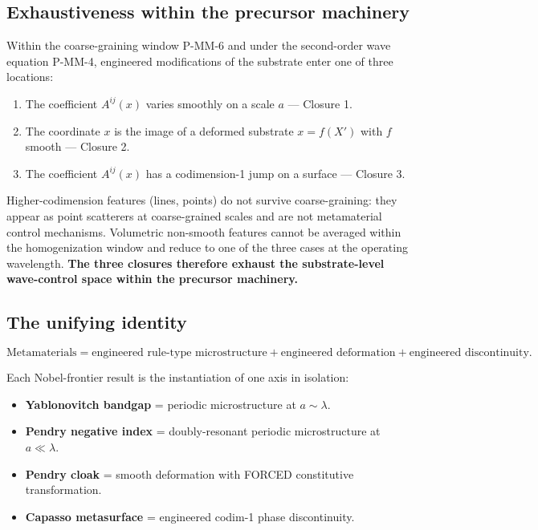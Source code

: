 \documentclass[11pt,a4paper]{article}
\begin{document}
\subsection{Exhaustiveness within the precursor machinery}

Within the coarse-graining window P-MM-6 and under the second-order wave equation P-MM-4, engineered modifications of the substrate enter one of three locations:

\begin{enumerate}[noitemsep]
\item The coefficient $A^{ij}(x)$ varies smoothly on a scale $a$ --- Closure 1.
\item The coordinate $x$ is the image of a deformed substrate $x = f(X')$ with $f$ smooth --- Closure 2.
\item The coefficient $A^{ij}(x)$ has a codimension-1 jump on a surface --- Closure 3.
\end{enumerate}

Higher-codimension features (lines, points) do not survive coarse-graining: they appear as point scatterers at coarse-grained scales and are not metamaterial control mechanisms. Volumetric non-smooth features cannot be averaged within the homogenization window and reduce to one of the three cases at the operating wavelength. \textbf{The three closures therefore exhaust the substrate-level wave-control space within the precursor machinery.}

\subsection{The unifying identity}

\[
\boxed{\text{Metamaterials} = \text{engineered rule-type microstructure} + \text{engineered deformation} + \text{engineered discontinuity}.}
\]

Each Nobel-frontier result is the instantiation of one axis in isolation:
\begin{itemize}[noitemsep]
\item \textbf{Yablonovitch bandgap} = periodic microstructure at $a \sim \lambda$.
\item \textbf{Pendry negative index} = doubly-resonant periodic microstructure at $a \ll \lambda$.
\item \textbf{Pendry cloak} = smooth deformation with FORCED constitutive transformation.
\item \textbf{Capasso metasurface} = engineered codim-1 phase discontinuity.
\end{itemize}
\end{document}
